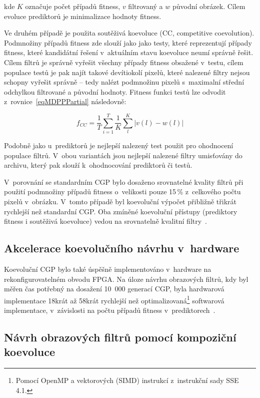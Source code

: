 \noindent{}kde $K$ označuje počet případů fitness, $v$ filtrovaný a $w$ původní obrázek. Cílem evoluce prediktorů je minimalizace hodnoty fitness.

Ve druhém případě je použita soutěživá koevoluce (CC, competitive coevolution). Podmnožiny případů fitness zde slouží jako jako testy, které reprezentují případy fitness, které kandidátní řešení v~aktuálním stavu koevoluce neumí správně řešit. Cílem filtrů je správně vyřešit všechny případy fitness obsažené v~testu, cílem populace testů je pak najít takové devítiokolí pixelů, které nalezené filtry nejsou schopny vyřešit správně -- tedy nalézt podmnožinu pixelů s~maximalní střední odchylkou filtrované a původní hodnoty. Fitness funkci testů lze odvodit z~rovnice~\ref{eqMDPPPartial} následovně:

\begin{equation}
    \label{eqFtestsIF}
    f_{\mathit{CC}} = \frac{1}{T} \sum\limits_{i=1}^{T} \frac{1}{K} \sum\limits_l^K \left| v\left( l \right) - w\left( l \right) \right|
\end{equation}

Podobně jako u~prediktorů je nejlepší nalezený test použit pro ohodnocení populace filtrů. V~obou variantách jsou nejlepší nalezené filtry umisťovány do archivu, který pak slouží k~ohodnocování prediktorů či testů.

V~porovnání se standardním CGP bylo dosaženo srovnatelné kvality filtrů při použití podmnožiny případů fitness o~velikosti pouze 15\,\% z~celkového počtu pixelů v~obrázku. V~tomto případě byl koevoluční výpočet přibližně třikrát rychlejší než standardní CGP. Oba zmíněné koevoluční přístupy (prediktory fitness i soutěživá koevoluce) vedou na srovnatelně kvalitní filtry~\cite{SikuPPSN}.

\subsection{Akcelerace koevolučního návrhu v~hardware}

Koevoluční CGP bylo také úspěšně implementováno v~hardware na rekonfigurovatelném obvodu FPGA. Na úloze návrhu obrazových filtrů, kdy byl měřen čas potřebný na dosažení 10~000 generací CGP, byla hardwarová implementace 18krát až 58krát rychlejší než optimalizovaná\footnote{Pomocí OpenMP a vektorových (SIMD) instrukcí z~instrukční sady SSE 4.1.} softwarová implementace, v~závislosti na počtu případů fitness v~prediktorech~\cite{Hrbacek}.

\subsection{Návrh obrazových filtrů pomocí kompoziční koevoluce}


